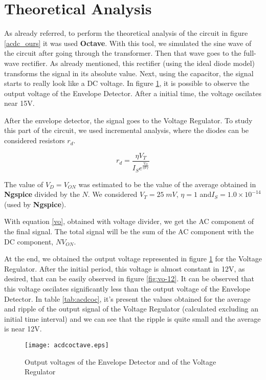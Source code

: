 \section{Theoretical Analysis}
\label{sec:analysis}

As already referred, to perform the theoretical analysis of the circuit in figure \ref{acdc_ours} it was used {\bf Octave}. With this tool, we simulated the sine wave of the circuit after going through the transformer. Then that wave goes to the full-wave rectifier. As already mentioned, this rectifier (using the ideal diode model) transforms the signal in its absolute value. Next, using the capacitor, the signal starts to really look like a DC voltage. In figure \ref{fig:acdcoc}, it is possible to observe the output voltage of the Envelope Detector. After a initial time, the voltage oscilates near 15V.

After the envelope detector, the signal goes to the Voltage Regulator. To study this part of the circuit, we used incremental analysis, where the diodes can be considered resistors $r_d$.

\begin{equation}
        r_d = \frac{\eta V_T}{I_Se^{\frac{V_D}{\eta V_T}}}
        \label{rd}
\end{equation}

The value of $V_D = V_{ON}$ was estimated to be the value of the average obtained in {\bf Ngspice} divided by the $N$. We considered $V_T=25\;mV$, $\eta = 1$ and$I_S = 1.0 \times 10^{-14}$ (used by {\bf Ngspice}).

With equation \ref{vo}, obtained with voltage divider, we get the AC component of the final signal. The total signal will be the sum of the AC component with the DC component, $N V_{ON}$.

At the end, we obtained the output voltage represented in figure \ref{fig:acdcoc} for the Voltage Regulator. After the initial period, this voltage is almost constant in 12V, as desired, that can be easily observed in figure \ref{fig:vo-12}. It can be observed that this voltage oscilates significantly less than the output voltage of the Envelope Detector. In table \ref{tab:acdcoc}, it's present the values obtained for the average and ripple of the output signal of the Voltage Regulator (calculated excluding an initial time interval) and we can see that the ripple is quite small and the average is near 12V.

\begin{figure}[H]
  \centering
  \texttt{[image: acdcoctave.eps]}
  \caption{Output voltages of the Envelope Detector and of the Voltage Regulator}
  \label{fig:acdcoc}
\end{figure}

